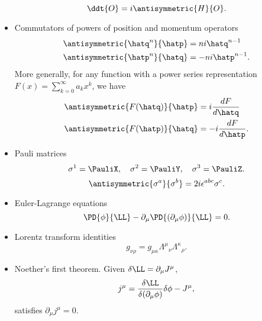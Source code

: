 \begin{itemize}
\begin{equation}\label{eqn:usefulFormulas:220}
\ddt{O} = i \antisymmetric{H}{O}.
\end{equation}
\item Commutators of powers of position and momentum operators
\begin{equation}\label{eqn:usefulFormulas:240}
\begin{aligned}
\antisymmetric{\hatq^n}{\hatp} &= n i \hatq^{n-1} \\
\antisymmetric{\hatp^n}{\hatq} &= -n i \hatp^{n-1}.
\end{aligned}
\end{equation}
More generally, for any function with a power series representation \( F(x) = \sum_{k = 0}^\infty a_k x^k \), we have
\begin{equation}\label{eqn:usefulFormulas:260}
\begin{aligned}
\antisymmetric{F(\hatq)}{\hatp} &= i \frac{dF}{d\hatq} \\
\antisymmetric{F(\hatp)}{\hatq} &= -i \frac{dF}{d\hatp}.
\end{aligned}
\end{equation}
\item Pauli matrices
\begin{equation}\label{eqn:usefulFormulas:280}
\sigma^1 = \PauliX, \quad
\sigma^2 = \PauliY, \quad
\sigma^3 = \PauliZ.
\end{equation}
\begin{equation}\label{eqn:usefulFormulas:300}
\antisymmetric{\sigma^a}{\sigma^b} = 2 i \epsilon^{a b c} \sigma^c.
\end{equation}
\item Euler-Lagrange equations
\begin{equation}\label{eqn:usefulFormulas:320}
\PD{\phi}{\LL} - \partial_\mu \PD{(\partial_\mu \phi)}{\LL} = 0.
\end{equation}
\item Lorentz transform identities
\begin{equation}\label{eqn:usefulFormulas:340}
g_{\nu\rho}
=
g_{\mu \kappa}
{\Lambda^\mu}_\nu
{\Lambda^\kappa}_\rho.
\end{equation}
\item Noether's first theorem.  Given \( \delta \LL = \partial_\mu J^\mu \),
\begin{equation}\label{eqn:usefulFormulas:480}
j^\mu =
\frac{\delta \LL}{\delta(\partial_\mu \phi)} \delta \phi  - J^\mu,
\end{equation}
satisfies \( \partial_\mu j^\mu = 0 \).

\end{itemize}
